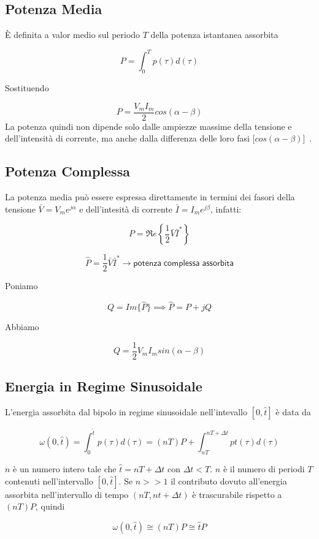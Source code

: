 \documentclass[a4paper]{report}
\begin{document}
\subsection{Potenza Media}
\`E definita a valor medio sul periodo $T$ della potenza istantanea
assorbita

\[
P=\int_0^T p(\tau) d(\tau)
\]

Sostituendo

\[
P=\dfrac{V_mI_m}{2}cos(\alpha -\beta)
\]
La potenza quindi non dipende solo dalle ampiezze massime della
tensione e dell'intensit\`a di corrente, ma anche dalla differenza
delle loro fasi [$cos(\alpha -\beta)$]\ .


\subsection{Potenza Complessa}
La potenza media pu\`o essere espressa direttamente in termini dei
fasori della tensione $\bar V=V_me^{j\alpha}$ e dell'intesit\`a di
corrente $\bar I=I_me^{j\beta}$, infatti:

\[
P=\Re e\left\{\dfrac{1}{2}\bar{V}\bar{I}^*\right\}
\]

\[
\widehat P=\dfrac{1}{2} \bar{V}\bar{I}^* \longrightarrow \mathsf{potenza\;
  complessa\; assorbita}
\]

Poniamo

\[
Q=Im \{\widehat P \} \implies \widehat P=P+jQ
\]

Abbiamo

\[
Q=\dfrac{1}{2}V_mI_m sin (\alpha-\beta)
\]

\subsection{Energia in Regime Sinusoidale}
L'energia assorbita dal bipolo in regime sinusoidale nell'intevallo $[0,
  \widehat {t}]$ \`e data da

\[
\omega (0, \widehat t)=\int_0^{\widehat t} p(\tau)d(\tau)=(nT)P+
\int_{nT}^{nT+\Delta t} pt(\tau)d(\tau)
\]


$n$ \`e un numero intero tale che $\widehat{t}=nT+\Delta t$ con $\Delta t<
T$. $n$ \`e il numero di periodi $T$ contenuti nell'intervallo $[0,
  \widehat t]$.
Se $n>>1$ il contributo dovuto all'energia assorbita nell'intervallo
di tempo $(nT, nt+\Delta t)$ \`e trascurabile rispetto a $(nT)P$,
quindi

\[
\omega(0,\widehat t) \cong (nT)P \cong {\widehat t} P
\]

\end{document}
